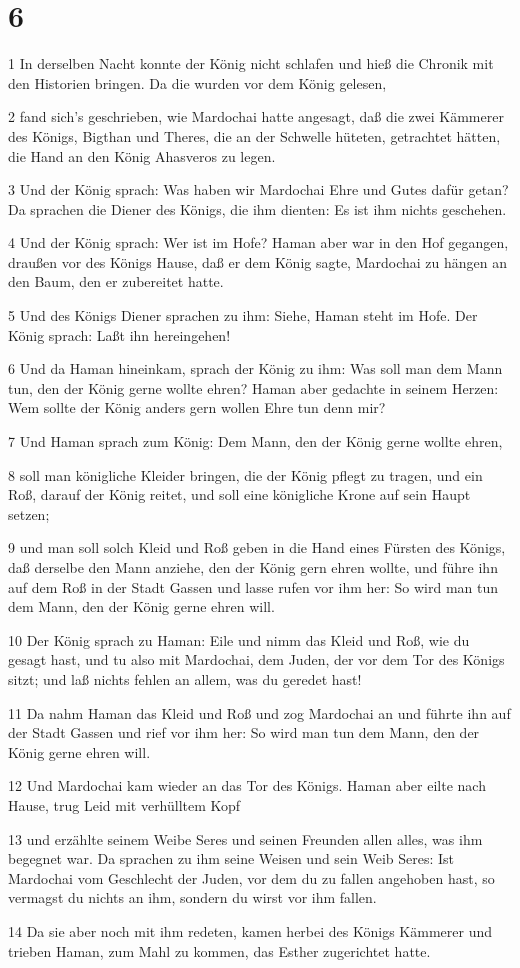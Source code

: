 \chapter{6}

\par 1 In derselben Nacht konnte der König nicht schlafen und hieß die Chronik mit den Historien bringen. Da die wurden vor dem König gelesen,
\par 2 fand sich's geschrieben, wie Mardochai hatte angesagt, daß die zwei Kämmerer des Königs, Bigthan und Theres, die an der Schwelle hüteten, getrachtet hätten, die Hand an den König Ahasveros zu legen.
\par 3 Und der König sprach: Was haben wir Mardochai Ehre und Gutes dafür getan? Da sprachen die Diener des Königs, die ihm dienten: Es ist ihm nichts geschehen.
\par 4 Und der König sprach: Wer ist im Hofe? Haman aber war in den Hof gegangen, draußen vor des Königs Hause, daß er dem König sagte, Mardochai zu hängen an den Baum, den er zubereitet hatte.
\par 5 Und des Königs Diener sprachen zu ihm: Siehe, Haman steht im Hofe. Der König sprach: Laßt ihn hereingehen!
\par 6 Und da Haman hineinkam, sprach der König zu ihm: Was soll man dem Mann tun, den der König gerne wollte ehren? Haman aber gedachte in seinem Herzen: Wem sollte der König anders gern wollen Ehre tun denn mir?
\par 7 Und Haman sprach zum König: Dem Mann, den der König gerne wollte ehren,
\par 8 soll man königliche Kleider bringen, die der König pflegt zu tragen, und ein Roß, darauf der König reitet, und soll eine königliche Krone auf sein Haupt setzen;
\par 9 und man soll solch Kleid und Roß geben in die Hand eines Fürsten des Königs, daß derselbe den Mann anziehe, den der König gern ehren wollte, und führe ihn auf dem Roß in der Stadt Gassen und lasse rufen vor ihm her: So wird man tun dem Mann, den der König gerne ehren will.
\par 10 Der König sprach zu Haman: Eile und nimm das Kleid und Roß, wie du gesagt hast, und tu also mit Mardochai, dem Juden, der vor dem Tor des Königs sitzt; und laß nichts fehlen an allem, was du geredet hast!
\par 11 Da nahm Haman das Kleid und Roß und zog Mardochai an und führte ihn auf der Stadt Gassen und rief vor ihm her: So wird man tun dem Mann, den der König gerne ehren will.
\par 12 Und Mardochai kam wieder an das Tor des Königs. Haman aber eilte nach Hause, trug Leid mit verhülltem Kopf
\par 13 und erzählte seinem Weibe Seres und seinen Freunden allen alles, was ihm begegnet war. Da sprachen zu ihm seine Weisen und sein Weib Seres: Ist Mardochai vom Geschlecht der Juden, vor dem du zu fallen angehoben hast, so vermagst du nichts an ihm, sondern du wirst vor ihm fallen.
\par 14 Da sie aber noch mit ihm redeten, kamen herbei des Königs Kämmerer und trieben Haman, zum Mahl zu kommen, das Esther zugerichtet hatte.

